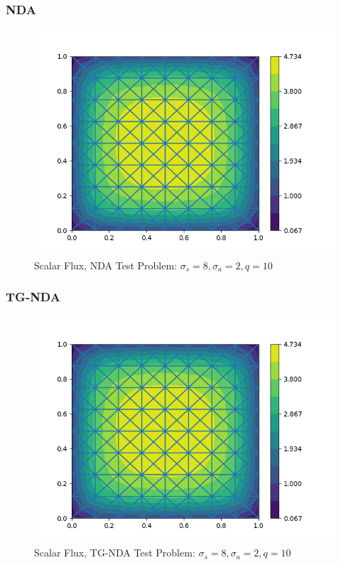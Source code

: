 \subsubsection{NDA}
\begin{figure}[H]
    \centering
    \includegraphics[width=\textwidth]{fig/nda_scat.png}
    \caption{Scalar Flux, NDA Test Problem: $\sigma_s = 8, \sigma_a = 2, q=10$}
    \label{fig:tgnda_scatter}
\end{figure}
\subsubsection{TG-NDA}
\begin{figure}[H]
    \centering
    \includegraphics[width=\textwidth]{fig/tgnda_scat.png}
    \caption{Scalar Flux, TG-NDA Test Problem: $\sigma_s = 8, \sigma_a = 2, q=10$}
    \label{fig:tgnda_scatter}
\end{figure}


